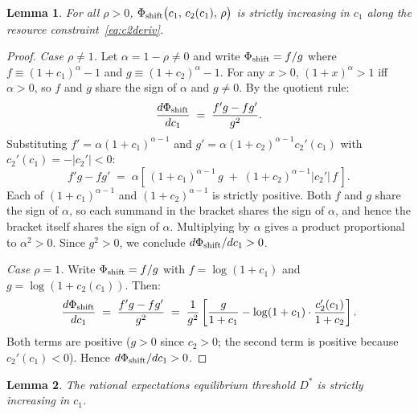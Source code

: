 \documentclass[12pt]{article}\usepackage[]{graphicx}\usepackage[]{xcolor}
\newtheorem{lemma}{Lemma}
\begin{document}
\begin{lemma}
\label{lem:phi}
For all $\rho > 0$, $\Phi_{\rm shift}\bigl(c_1,\, c_2(c_1),\, \rho\bigr)$ is strictly increasing in $c_1$ along the resource constraint~\eqref{eq:c2deriv}.
\end{lemma}

\begin{proof}
\textit{Case $\rho \neq 1$.}\; Let $\alpha = 1-\rho \neq 0$ and write $\Phi_{\rm shift} = f/g$ where $f \equiv (1+c_1)^\alpha - 1$ and $g \equiv (1+c_2)^\alpha - 1$.
For any $x > 0$, $(1+x)^\alpha > 1$ iff $\alpha > 0$, so $f$ and $g$ share the sign of $\alpha$ and $g \neq 0$.
By the quotient rule: \[ \frac{d\Phi_{\rm shift}}{dc_1} \;=\; \frac{f'g - fg'}{g^2}. \] Substituting $f' = \alpha(1+c_1)^{\alpha-1}$ and $g' = \alpha(1+c_2)^{\alpha-1}c_2'(c_1)$ with $c_2'(c_1) = -|c_2'| < 0$: \[ f'g - fg' \;=\; \alpha\!\left[\,(1+c_1)^{\alpha-1}\,g \;+\; (1+c_2)^{\alpha-1}|c_2'|\,f\,\right]. \] Each of $(1+c_1)^{\alpha-1}$ and $(1+c_2)^{\alpha-1}$ is strictly positive.
Both $f$ and $g$ share the sign of $\alpha$, so each summand in the bracket shares the sign of $\alpha$, and hence the bracket itself shares the sign of $\alpha$.
Multiplying by $\alpha$ gives a product proportional to $\alpha^2 > 0$.
Since $g^2 > 0$, we conclude $d\Phi_{\rm shift}/dc_1 > 0$.

\textit{Case $\rho = 1$.}\; Write $\Phi_{\rm shift} = f/g$ with $f = \log(1+c_1)$ and $g = \log(1+c_2(c_1))$.
Then: \[ \frac{d\Phi_{\rm shift}}{dc_1} \;=\; \frac{f'g - fg'}{g^2} \;=\; \frac{1}{g^2} \left[\frac{g}{1+c_1} - \log(1+c_1)\cdot\frac{c_2'(c_1)}{1+c_2}\right]. \] Both terms are positive ($g > 0$ since $c_2 > 0$; the second term is positive because $c_2'(c_1) < 0$).
Hence $d\Phi_{\rm shift}/dc_1> 0$.
\end{proof}

\begin{lemma}
\label{lem:dstar}
The rational expectations equilibrium threshold $D^*$ is strictly increasing in $c_1$.
\end{lemma}
\end{document}
